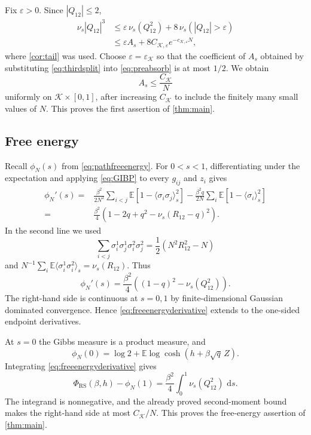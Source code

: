 \documentclass[11pt]{article}
\numberwithin{equation}{section}
\theoremstyle{plain}
\theoremstyle{definition}
\newcommand{\E}{\mathbb E}
\newcommand{\1}{\mathbf 1}
\newcommand{\RS}{\mathrm{RS}}
\newcommand{\cK}{\mathcal K}
\newcommand{\dd}{\,\mathrm d}
\begin{document}
Fix $\varepsilon>0$.  Since $|Q_{12}|\le2$,
\begin{align}
 \nu_s|Q_{12}|^3
 &\le
 \varepsilon\,\nu_s(Q_{12}^2)
 +8\,\nu_s(|Q_{12}|>\varepsilon)\nonumber\\
 &\le
 \varepsilon A_s
 +8C_{\cK,\varepsilon}e^{-c_{\cK,\varepsilon}N},
 \label{eq:thirdsplit}
\end{align}
where \cref{cor:tail} was used.  Choose $\varepsilon=\varepsilon_{\cK}$
so that the coefficient of $A_s$ obtained by substituting
\eqref{eq:thirdsplit} into \eqref{eq:preabsorb} is at most $1/2$.
We obtain
\[
 A_s\le\frac{C_{\cK}}N
\]
uniformly on $\cK\times[0,1]$, after increasing $C_{\cK}$ to include
the finitely many small values of $N$.  This proves the first assertion
of \cref{thm:main}.

\subsection{Free energy}\label{subsec:freeenergy}

Recall $\phi_N(s)$ from \eqref{eq:pathfreeenergy}.  For $0<s<1$,
differentiating under the expectation and applying \eqref{eq:GIBP} to
every $g_{ij}$ and $z_i$ gives
\begin{align*}
 \phi_N'(s)
 ={}&\frac{\beta^2}{2N^2}\sum_{i<j}
 \E\left[1-\langle\sigma_i\sigma_j\rangle_s^2\right]
 -\frac{\beta^2q}{2N}\sum_i
 \E\left[1-\langle\sigma_i\rangle_s^2\right]\\
 ={}&\frac{\beta^2}{4}
 \left(1-2q+q^2-\nu_s(R_{12}-q)^2\right).
\end{align*}
In the second line we used
\[
 \sum_{i<j}\sigma_i^1\sigma_j^1\sigma_i^2\sigma_j^2
 =\frac12\left(N^2R_{12}^2-N\right)
\]
and
$N^{-1}\sum_i\E\langle\sigma_i^1\sigma_i^2\rangle_s
=\nu_s(R_{12})$.  Thus
\begin{equation}
 \phi_N'(s)=\frac{\beta^2}{4}
 \left((1-q)^2-\nu_s(Q_{12}^2)\right).
 \label{eq:freeenergyderivative}
\end{equation}
The right-hand side is continuous at $s=0,1$ by finite-dimensional
Gaussian dominated convergence.  Hence
\eqref{eq:freeenergyderivative} extends to the one-sided endpoint
derivatives.

At $s=0$ the Gibbs measure is a product measure, and
\[
 \phi_N(0)=\log2+\E\log\cosh(h+\beta\sqrt q\,Z).
\]
Integrating \eqref{eq:freeenergyderivative} gives
\begin{equation}
 \Phi_{\RS}(\beta,h)-\phi_N(1)
 =
 \frac{\beta^2}{4}\int_0^1\nu_s(Q_{12}^2)\,\dd s.
 \label{eq:freeenergyidentity}
\end{equation}
The integrand is nonnegative, and the already proved second-moment
bound makes the right-hand side at most $C_{\cK}/N$.  This proves the
free-energy assertion of \cref{thm:main}.
\end{document}
